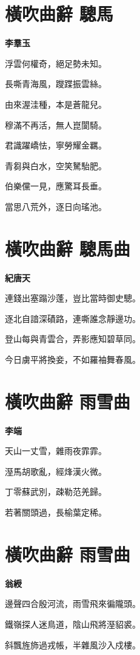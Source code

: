 \documentclass[12pt,a4paper]{ctexbook}
\begin{document}
\section{橫吹曲辭 驄馬}
\textbf{李羣玉}\par\vspace{0.5em}
浮雲何權奇，絕足勢未知。\par
長嘶青海風，躞蹀振雲絲。\par
由來渥洼種，本是蒼龍兒。\par
穆滿不再活，無人崑閬騎。\par
君識躍嶠怯，寧勞耀金羈。\par
青芻與白水，空笑駑駘肥。\par
伯樂儻一見，應驚耳長垂。\par
當思八荒外，逐日向瑤池。\par

\section{橫吹曲辭 驄馬曲}
\textbf{紀唐天}\par\vspace{0.5em}
連錢出塞蹋沙蓬，豈比當時御史驄。\par
逐北自諳深磧路，連嘶誰念靜邊功。\par
登山每與青雲合，弄影應知碧草同。\par
今日虜平將換妾，不如羅袖舞春風。\par

\section{橫吹曲辭 雨雪曲}
\textbf{李端}\par\vspace{0.5em}
天山一丈雪，雜雨夜霏霏。\par
溼馬胡歌亂，經烽漢火微。\par
丁零蘇武別，疎勒范羌歸。\par
若著關頭過，長榆葉定稀。\par

\section{橫吹曲辭 雨雪曲}
\textbf{翁綬}\par\vspace{0.5em}
邊聲四合殷河流，雨雪飛來徧隴頭。\par
鐵嶺探人迷鳥道，陰山飛將溼貂裘。\par
斜飄旌斾過戎帳，半雜風沙入戍樓。\par
\end{document}
